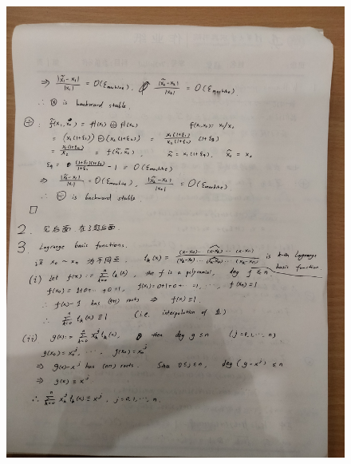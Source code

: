 \documentclass{article}
\begin{document}
\begin{figure}[htbp]
	\centering
	\includegraphics[width=\textwidth]{hwna0202.jpg}
\end{figure}
\end{document}
